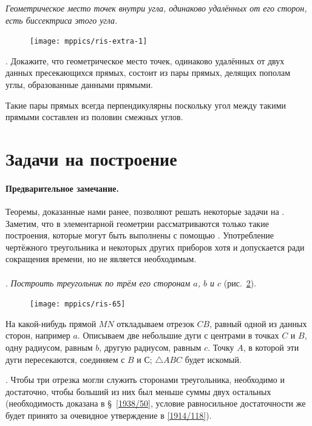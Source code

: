 \documentclass[oneside]{book}
\begin{document}
\emph{Геометрическое место точек внутри угла, одинаково удалённых от его сторон, есть биссектриса этого угла.}

\begin{figure}
\centering
\texttt{[image: mppics/ris-extra-1]}
\caption{}\label{extra/1}
\end{figure}

\smallskip
\mbox{.} Докажите, что геометрическое место точек, одинаково удалённых от двух данных пресекающихся прямых, состоит из пары прямых, делящих пополам углы, образованные данными прямыми.

Такие пары прямых всегда перпендикулярны поскольку угол между такими прямыми составлен из половин смежных углов.

\section{Задачи на построение}

\paragraph{Предварительное замечание.}\label{1938/61}
Теоремы, доказанные нами ранее, позволяют решать некоторые задачи на .
Заметим, что в элементарной геометрии рассматриваются только такие построения, которые могут быть выполнены с помощью .
Употребление чертёжного треугольника и некоторых других приборов хотя и допускается ради сокращения времени, но не является необходимым.

\paragraph{}\label{1938/62}
.
\emph{Построить треугольник по трём его сторонам $a$, $b$ и $c$} (рис.~\ref{1938/ris-65}).

\begin{figure}[h!]
\centering
\texttt{[image: mppics/ris-65]}
\caption{}\label{1938/ris-65}
\end{figure}

На какой-нибудь прямой $MN$ откладываем отрезок $CB$, равный одной из данных сторон, например $a$.
Описываем две небольшие дуги с центрами в точках $C$ и $B$, одну радиусом, равным $b$, другую радиусом, равным $c$.
Точку $A$, в которой эти дуги пересекаются, соединяем с $B$ и С;
$\triangle ABC$ будет искомый.

\smallskip
{}.
Чтобы три отрезка могли служить сторонами треугольника, необходимо и достаточно, чтобы больший из них был меньше суммы двух остальных (необходимость доказана в §~\ref{1938/50}, условие равносильное достаточности же будет принято за очевидное утверждение в \ref{1914/118}).
\end{document}
